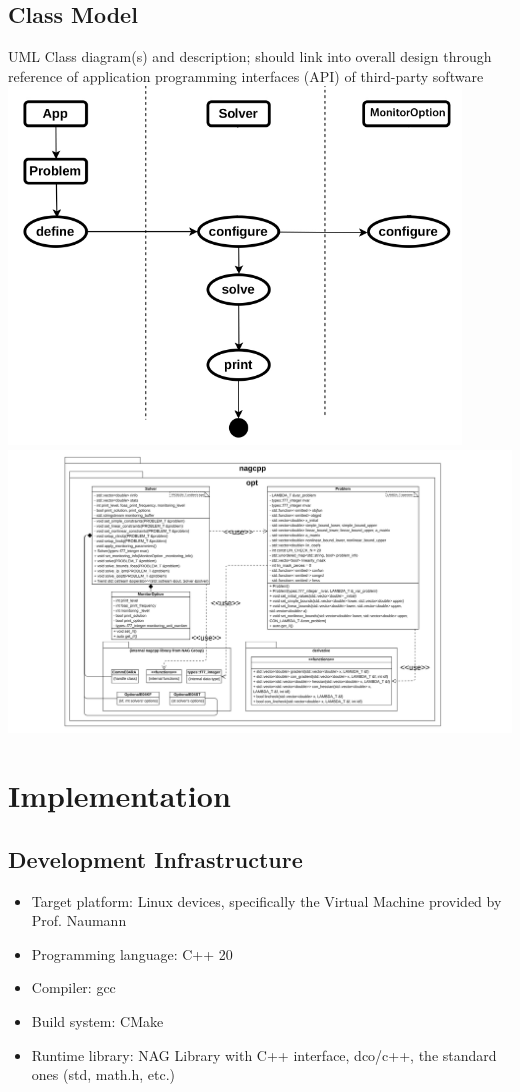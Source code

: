 \documentclass{book}
\begin{document}
\section{Class Model}
UML Class diagram(s) and description; should link into overall design through
reference of application programming interfaces (API) of third-party software\\
\includegraphics[width=0.9\textwidth]{Class Model - Optimize function.pdf}\\
\includegraphics[width=\textwidth]{class diagram.pdf}\\

\chapter{Implementation} \label{ch:implementation}

\section{Development Infrastructure}
\begin{itemize}
	\item Target platform: Linux devices, specifically the Virtual Machine provided by Prof. Naumann
	\item Programming language: C++ 20
	\item Compiler: gcc
	\item Build system: CMake
	\item Runtime library: NAG Library with C++ interface, dco/c++, the standard ones (std, math.h, etc.)
\end{itemize}
\end{document}
